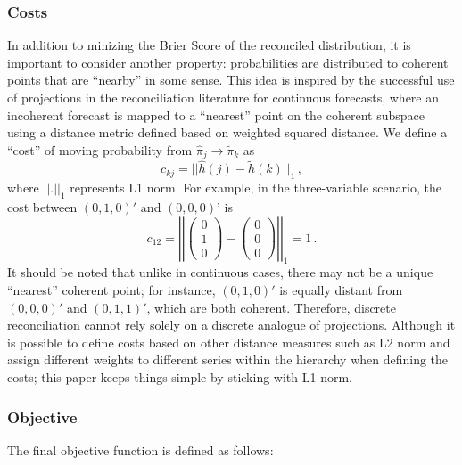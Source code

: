 \documentclass[a4paper,review,12pt,authoryear]{elsarticle}
\begin{document}
    \subsubsection*{\textbf{Costs}}
    In addition to minizing the Brier Score of the reconciled distribution, it is important to consider another property: probabilities are distributed to coherent points that are ``nearby'' in some sense. 
    This idea is inspired by the successful use of projections in the reconciliation literature for continuous forecasts, where an incoherent forecast is mapped to  a ``nearest'' point on the coherent subspace using a distance metric defined based on weighted squared distance.
    We define a ``cost'' of moving probability from $\hat{\pi}_j\rightarrow\tilde{\pi}_k$ as
    \[
    c_{kj}=||\hat{h}(j)-\tilde{h}(k)||_1\,,
    \]
    where $||.||_1$ represents L1 norm. For example, in the three-variable scenario, the cost between $(0, 1, 0)'$ and $(0, 0, 0)$' is
    \[
    c_{12}=\left|\left|\begin{pmatrix}0\\1\\0\end{pmatrix}-\begin{pmatrix}0\\0\\0\end{pmatrix}\right|\right|_1=1\,.
    \]
    It should be noted that unlike in continuous cases, there may not be a unique ``nearest'' coherent point; for instance, $(0,1,0)'$ is equally distant from $(0,0,0)'$ and $(0,1,1)'$, which are both coherent. 
    Therefore, discrete reconciliation cannot rely solely on a discrete analogue of projections.
    Although it is possible to define costs based on other distance measures such as L2 norm and assign different weights to different series within the hierarchy when defining the costs; this paper keeps things simple by sticking with L1 norm.

    
    \subsubsection*{\textbf{Objective}}

    The final objective function is defined as follows:
    
\end{document}
